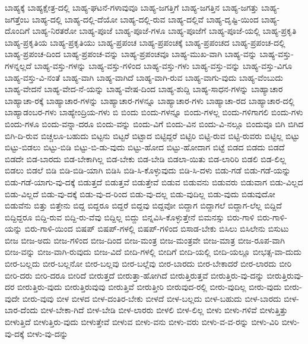 {ಬಾಹ್ಯಕ್ಕೆ
ಬಾಹ್ಯಕ್ಷೇತ್ರ-ದಲ್ಲಿ
ಬಾಹ್ಯ-ಘಟನೆ-ಗಳಾವುವೂ
ಬಾಹ್ಯ-ಜಗತ್ತಿಗೆ
ಬಾಹ್ಯ-ಜಗತ್ತಿನ
ಬಾಹ್ಯ-ಜಗತ್ತು
ಬಾಹ್ಯ-ಜಗತ್ತೆಂಬ
ಬಾಹ್ಯ-ದಲ್ಲಿ
ಬಾಹ್ಯ-ದಲ್ಲಿ-ದೆಯೋ
ಬಾಹ್ಯ-ದಲ್ಲಿ-ರುವ
ಬಾಹ್ಯ-ದಲ್ಲಿವೆ
ಬಾಹ್ಯ-ದೃಷ್ಟಿ-ಯಿಂದ
ಬಾಹ್ಯ-ದೊಂದಿಗೆ
ಬಾಹ್ಯ-ನಿರತರೋ
ಬಾಹ್ಯ-ಪೂಜೆ
ಬಾಹ್ಯ-ಪೂಜೆ-ಗಳೂ
ಬಾಹ್ಯ-ಪೂಜೆಗೆ
ಬಾಹ್ಯ-ಪೂಜೆ-ಯಲ್ಲಿ
ಬಾಹ್ಯ-ಪ್ರಕೃತಿ
ಬಾಹ್ಯ-ಪ್ರಕೃತಿಯ
ಬಾಹ್ಯ-ಪ್ರಕೃತಿಯು
ಬಾಹ್ಯ-ಪ್ರಪಂಚ
ಬಾಹ್ಯ-ಪ್ರಪಂಚಕ್ಕೆ
ಬಾಹ್ಯ-ಪ್ರಪಂಚದ
ಬಾಹ್ಯ-ಪ್ರಪಂಚ-ದಲ್ಲಿ
ಬಾಹ್ಯ-ಪ್ರಪಂಚ-ದಿಂದ
ಬಾಹ್ಯ-ಪ್ರಪಂಚ-ವನ್ನು
ಬಾಹ್ಯ-ಪ್ರಪಂಚವೂ
ಬಾಹ್ಯ-ಮುಖ-ವಾಗಿ
ಬಾಹ್ಯ-ವನ್ನು
ಬಾಹ್ಯ-ವಸ್ತು-ಗಳನ್ನಲ್ಲದೆ
ಬಾಹ್ಯ-ವಸ್ತು-ಗಳನ್ನು
ಬಾಹ್ಯ-ವಸ್ತು-ಗಳಿಂದ
ಬಾಹ್ಯ-ವಸ್ತು-ಗಳು
ಬಾಹ್ಯ-ವಸ್ತು-ವನ್ನು
ಬಾಹ್ಯ-ವಸ್ತು-ವಿಗೂ
ಬಾಹ್ಯ-ವಸ್ತು-ವಿ-ನಂತೆ
ಬಾಹ್ಯ-ವಾಗಿ
ಬಾಹ್ಯ-ವಾಗಿದೆ
ಬಾಹ್ಯ-ವಾಗಿ-ರುವ
ಬಾಹ್ಯ-ವಾಗು-ವುದು
ಬಾಹ್ಯ-ವೆಂಬುದು
ಬಾಹ್ಯ-ವೇದನೆ
ಬಾಹ್ಯ-ವೇದ-ನೆ-ಯನ್ನು
ಬಾಹ್ಯ-ವೇಷ-ದಿಂದ
ಬಾಹ್ಯ-ಶುದ್ದಿ
ಬಾಹ್ಯ-ಸಾಧನ-ಗಳನ್ನು
ಬಾಹ್ಯಾಚಾರ
ಬಾಹ್ಯಾಚಾ-ರಕ್ಕೆ
ಬಾಹ್ಯಾಚಾರ-ಗಳನ್ನು
ಬಾಹ್ಯಾಚಾರ-ಗಳನ್ನೂ
ಬಾಹ್ಯಾಚಾರ-ಗಳು
ಬಾಹ್ಯಾಚಾ-ರದ
ಬಾಹ್ಯಾಚಾರ-ದಲ್ಲಿ
ಬಾಹ್ಯಾಡಂಬರ-ಗಳು
ಬಾಹ್ಯೇಂದ್ರಿಯ-ಗಳು
ಬಿ
ಬಿಂದು
ಬಿಂದು-ಗಳನ್ನೂ
ಬಿಂದು-ಗಳಲ್ಲ
ಬಿಂದು-ಗಳಿಗಾಗಲಿ
ಬಿಂದು-ಗಳು
ಬಿಂದು-ಗಳೂ
ಬಿಂದು-ವನ್ನಾ-ದರೂ
ಬಿಂದು-ವನ್ನು
ಬಿಂದು-ವಿಗೆ
ಬಿಂದು-ವಿನ
ಬಿಂದು-ವಿ-ನಲ್ಲೂ
ಬಿಂದುವೂ
ಬಿಗಿ
ಬಿಗಿದ
ಬಿಗಿ-ದಿ-ರುವ
ಬಿಚ್ಚಲೂ-ಬಹುದು
ಬಿಟ್ಟನು
ಬಿಟ್ಟರೆ
ಬಿಟ್ಟಾದ
ಬಿಟ್ಟಿದ್ದರೆ
ಬಿಟ್ಟಿರಿ
ಬಿಟ್ಟಿ-ರುವ
ಬಿಟ್ಟಿ-ರುವರು
ಬಿಟ್ಟಿಲ್ಲ
ಬಿಟ್ಟು
ಬಿಟ್ಟು-ಬಿಡಲು
ಬಿಟ್ಟು-ಬಿಡಿ
ಬಿಟ್ಟು-ಬಿ-ಡು-ವುದು
ಬಿಟ್ಟು-ಹೋದ
ಬಿಟ್ಟು-ಹೋದಾಗ
ಬಿಟ್ಟೆ
ಬಿಡದ
ಬಿಡದು
ಬಿಡದೆ
ಬಿಡದೇ
ಬಿಡ-ಬಾರದು
ಬಿಡ-ಬೇಕಾಗಿಲ್ಲ
ಬಿಡ-ಬೇಕು
ಬಿಡ-ಬೇಡಿ
ಬಿಡಲಾ-ಯಿತು
ಬಿಡ-ಲಾರಿರಿ
ಬಿಡಲಿ
ಬಿಡ-ಲಿಲ್ಲ
ಬಿಡಲು
ಬಿಡಲೆ
ಬಿಡಿ
ಬಿಡಿ-ಬಿಡಿ-ಯಾಗಿ
ಬಿಡಿಸಿ
ಬಿಡಿ-ಸಿ-ಕೊಳ್ಳುವುದು
ಬಿಡಿ-ಸಿ-ದಳು
ಬಿಡು-ಗಡೆ
ಬಿಡು-ಗಡೆ-ಯನ್ನು
ಬಿಡು-ಗಡೆ-ಯಾಗು-ವು-ದಕ್ಕೆ
ಬಿಡುತ್ತದೆ
ಬಿಡುತ್ತವೆ
ಬಿಡುತ್ತೇವೆ
ಬಿಡುವ
ಬಿಡುವನು
ಬಿಡುವರು
ಬಿಡುವಾಗ
ಬಿಡು-ವಿಲ್ಲದ
ಬಿಡು-ವಿಲ್ಲದೆ
ಬಿಡು-ವು-ದಕ್ಕೆ
ಬಿಡು-ವು-ದ-ರಿಂದ
ಬಿಡು-ವು-ದಲ್ಲ
ಬಿಡು-ವುದಿಲ್ಲ
ಬಿಡು-ವುದು
ಬಿಡುವುದೋ
ಬಿಡುವೆನು
ಬಿತ್ತು
ಬಿತ್ತೇನು
ಬಿದ್ದ
ಬಿದ್ದರೂ
ಬಿದ್ದರೆ
ಬಿದ್ದವು
ಬಿದ್ದವೋ
ಬಿದ್ದಾಗ
ಬಿದ್ದಾಗಲೆ
ಬಿದ್ದಾಗ-ಲೆಲ್ಲ
ಬಿದ್ದಿದೆ
ಬಿದ್ದಿದ್ದರೂ
ಬಿದ್ದಿ-ರುವ
ಬಿದ್ದಿ-ರು-ವೆವು
ಬಿದ್ದಿಲ್ಲ
ಬಿದ್ದು
ಬಿನ್ನವಿಸಿ-ಕೊಳ್ಳುತ್ತೇನೆ
ಬಿಮನಸ್ಸು
ಬಿರು-ಗಾಳಿ
ಬಿರು-ಗಾಳಿ-ಯನ್ನು
ಬಿರು-ಗಾಳಿ-ಯಿಂದ
ಬಿಷಪ್
ಬಿಷಪ್-ಗಳಲ್ಲಿ
ಬಿಷಪ್-ಗಳಿಂದ
ಬಿಸಾಡ-ಬೇಕು
ಬಿಸಿಲು
ಬಿಸಿಲೇನು
ಬಿಸುಟು
ಬೀಜ
ಬೀಜ-ಅದು
ಬೀಜ-ಗಳಿಂದ
ಬೀಜ-ದಿಂದ
ಬೀಜ-ಮಂತ್ರ
ಬೀಜ-ಮಂತ್ರವೇ
ಬೀಜ-ಮಾತ್ರ
ಬೀಜ-ರೂಪ-ವಾಗಿ
ಬೀಜ-ವನ್ನು
ಬೀಜ-ವಾಗಿ-ರುವುದು
ಬೀಜ-ವಿದೆ
ಬೀದಿ-ಗಳಲ್ಲಿ
ಬೀದಿಗೆ
ಬೀದಿ-ಯಲ್ಲಿ
ಬೀದಿ-ಯಲ್ಲೂ
ಬೀಭತ್ಸ-ವಾ-ದುದು
ಬೀರ-ಬಲ್ಲದು
ಬೀರ-ಬಲ್ಲನೋ
ಬೀರ-ಬಲ್ಲವು
ಬೀರ-ಬಲ್ಲೆವು
ಬೀರ-ಬಾರದು
ಬೀರ-ಬೇಕಾದರೆ
ಬೀರ-ಲಾರದು
ಬೀರಿ
ಬೀರಿ-ದರು
ಬೀರಿ-ದರೂ
ಬೀರಿದೆ
ಬೀರುತ್ತದೆ
ಬೀರುತ್ತಾ-ಹೋಗಿದೆ
ಬೀರುತ್ತಿರುತ್ತವೆ
ಬೀರುತ್ತಿರು-ವು-ದನ್ನು
ಬೀರುತ್ತಿರುವು-ದರ
ಬೀರುತ್ತಿರು-ವುದು
ಬೀರುತ್ತಿರುವುವು
ಬೀರುತ್ತಿವೆ
ಬೀರುತ್ತೀರಿ
ಬೀರುವುದ-ರಲ್ಲಿ
ಬೀರು-ವುದಿಲ್ಲ
ಬೀರು-ವುದು
ಬೀರು-ವುದೇ
ಬೀರು-ವುವು
ಬೀಳ
ಬೀಳದ
ಬೀಳ-ದಂತಿರ-ಬೇಕು
ಬೀಳದೆ
ಬೀಳ-ಬಲ್ಲದು
ಬೀಳ-ಬಹುದು
ಬೀಳ-ಬಾರದು
ಬೀಳ-ಬಾರ-ದೆಂದು
ಬೀಳ-ಬೇಕಾ-ಗಿದೆ
ಬೀಳ-ಬೇಡಿ
ಬೀಳ-ಲಾರರು
ಬೀಳಲಿ
ಬೀಳ-ಲಿಲ್ಲ
ಬೀಳು
ಬೀಳು-ಗಳಿವೆ
ಬೀಳುತ್ತಿತ್ತು
ಬೀಳುತ್ತಿದೆ
ಬೀಳುತ್ತಿರು-ವುದು
ಬೀಳುತ್ತೇವೆ
ಬೀಳುವ
ಬೀಳು-ವನು
ಬೀಳು-ವರು
ಬೀಳು-ವ-ವ-ರನ್ನು
ಬೀಳು-ವಿರಿ
ಬೀಳು-ವು-ದಕ್ಕೆ
ಬೀಳು-ವು-ದನ್ನು
}
